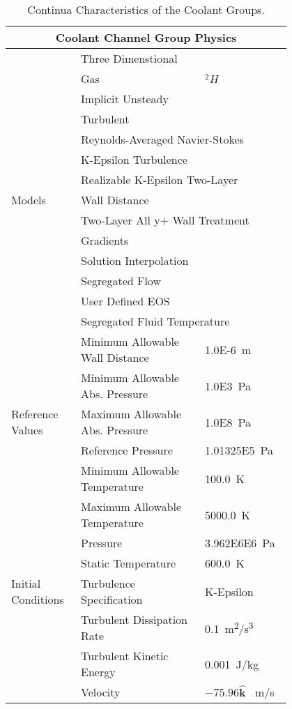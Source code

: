 \documentclass[8pt,a5paper]{article}
\begin{document}
\begin{table}[h!]
    \label{table: Table 4}
    \centering
    \small
    \caption{Continua Characteristics of the Coolant Groups.}
    \begin{tabular}{|m{0.2\linewidth}|m{0.4\linewidth}|m{0.2\linewidth}|}
    \hline
    \multicolumn{3}{|c|}{\textbf{Coolant Channel Group Physics}}\\\hline
    & \multicolumn{2}{l|}{Three Dimenstional}\\\cline{2-3}
    & Gas & $^{2}H$\\\cline{2-3}
    & \multicolumn{2}{l|}{Implicit Unsteady}\\\cline{2-3}
    & \multicolumn{2}{l|}{Turbulent}\\\cline{2-3}
    & \multicolumn{2}{l|}{Reynolds-Averaged Navier-Stokes}\\\cline{2-3}
    & \multicolumn{2}{l|}{K-Epsilon Turbulence}\\\cline{2-3}
    & \multicolumn{2}{l|}{Realizable K-Epsilon Two-Layer}\\\cline{2-3}
    Models & \multicolumn{2}{l|}{Wall Distance}\\\cline{2-3}
    & \multicolumn{2}{l|}{Two-Layer All y+ Wall Treatment}\\\cline{2-3}
    & \multicolumn{2}{l|}{Gradients}\\\cline{2-3}
    & \multicolumn{2}{l|}{Solution Interpolation}\\\cline{2-3}
    & \multicolumn{2}{l|}{Segregated Flow}\\\cline{2-3}
    & \multicolumn{2}{l|}{User Defined EOS}\\\cline{2-3}
    & \multicolumn{2}{l|}{Segregated Fluid Temperature}\\\hline
    & Minimum Allowable Wall Distance & \SI{1.0E-6}{m}\\\cline{2-3}
    & Minimum Allowable Abs. Pressure & \SI{1.0E3}{Pa}\\\cline{2-3}
    Reference Values & Maximum Allowable Abs. Pressure & \SI{1.0E8}{Pa}\\\cline{2-3}
    & Reference Pressure & \SI{1.01325E5}{Pa}\\\cline{2-3}
    & Minimum Allowable Temperature & \SI{100.0}{K}\\\cline{2-3}
    & Maximum Allowable Temperature & \SI{5000.0}{K}\\\hline
    & Pressure & \SI{3.962E6E6}{Pa}\\\cline{2-3}
    & Static Temperature & \SI{600.0}{K}\\\cline{2-3}
    Initial Conditions & Turbulence Specification & K-Epsilon\\\cline{2-3}
    & Turbulent Dissipation Rate & \SI{0.1}{m^2/s^3}\\\cline{2-3}
    & Turbulent Kinetic Energy & \SI{0.001}{J/kg}\\\cline{2-3}
    & Velocity & $-75.96\hat{\textbf{k}}$ \SI{}{m/s}\\\hline
    \end{tabular}
\end{table}
\end{document}
